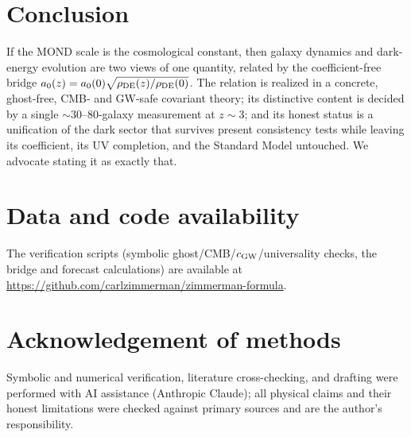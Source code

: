 \documentclass[11pt]{article}
\newcommand{\az}{a_0}
\newcommand{\rde}{\rho_{\rm DE}}
\begin{document}
\section{Conclusion}
If the MOND scale is the cosmological constant, then galaxy dynamics and dark-energy evolution are two views of one
quantity, related by the coefficient-free bridge $\az(z)=\az(0)\sqrt{\rde(z)/\rde(0)}$. The relation is realized in a
concrete, ghost-free, CMB- and GW-safe covariant theory; its distinctive content is decided by a single
$\sim$30--80-galaxy measurement at $z\sim3$; and its honest status is a unification of the dark sector that survives
present consistency tests while leaving its coefficient, its UV completion, and the Standard Model untouched. We
advocate stating it as exactly that.

\section*{Data and code availability}
The verification scripts (symbolic ghost/CMB/$c_{\rm GW}$/universality checks, the bridge and forecast
calculations) are available at \url{https://github.com/carlzimmerman/zimmerman-formula}.

\section*{Acknowledgement of methods}
Symbolic and numerical verification, literature cross-checking, and drafting were performed with AI assistance
(Anthropic Claude); all physical claims and their honest limitations were checked against primary sources and are
the author's responsibility.
\end{document}
